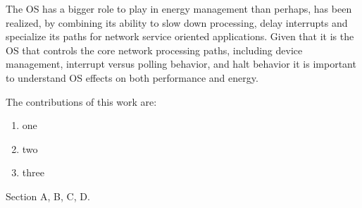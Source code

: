 \label{sec:intro}

\begin{em} 
The OS has a bigger role to play in energy management than perhaps, has been realized, by combining its ability to slow down processing, delay interrupts and specialize its paths for network service oriented applications.   Given that it is the OS that controls the core network processing paths, including device management, interrupt versus polling behavior, and halt behavior it is important to understand OS effects on both performance and energy.
\end{em}

The contributions of this work are:
\begin{enumerate}
	\item one
	\item two
	\item three
\end{enumerate}

Section A, B, C, D.




